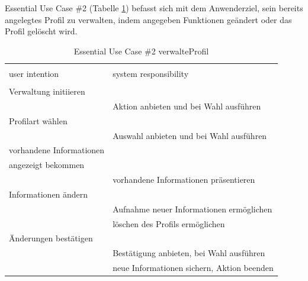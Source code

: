 \newpage
Essential Use Case \#2 (Tabelle \ref{tab:profilverwalten}) befasst sich mit dem Anwenderziel, sein bereits angelegtes Profil zu verwalten, indem angegeben Funktionen geändert oder das Profil gelöscht wird.
\begin{table}[H]
\caption{Essential Use Case \#2 verwalteProfil }
\centering
\begin{tabular}{l l}
\\ [-0.5ex]

\hline\hline
\\ [-0.5ex]
user intention & system responsibility
\\ [1.5ex]
\hline
\\ [-0.5ex]
Verwaltung initiieren      &                                 \\[1ex]
                     & Aktion anbieten und bei Wahl ausführen     \\[1ex]
Profilart wählen        &                                 \\[1ex]
                     & Auswahl anbieten und bei Wahl ausführen  \\[1ex]             
vorhandene Informationen   &                                 \\[1ex]
angezeigt bekommen         &                                 \\[1ex]
                     & vorhandene Informationen präsentieren      \\[1ex] 
Informationen ändern       &                                 \\[1ex] 
                     & Aufnahme neuer Informationen ermöglichen    \\[1ex]
                     & löschen des Profils ermöglichen          \\[1ex]
Änderungen bestätigen      &                                 \\[1ex]
                     & Bestätigung anbieten, bei Wahl ausführen   \\[1ex]
                     & neue Informationen sichern, Aktion beenden \\[1ex]

\hline
\end{tabular}
\label{tab:profilverwalten}
\end{table}

